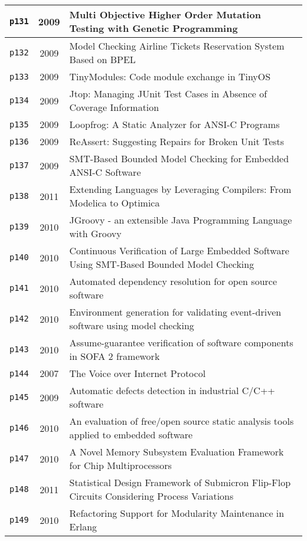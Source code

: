 \begin{longtable}{| c | c | p{16cm} |}
  \hline
  \texttt{p131} & 2009 & Multi Objective Higher Order Mutation Testing with Genetic Programming \\
  \hline
  \texttt{p132} & 2009 & Model Checking Airline Tickets Reservation System Based on BPEL \\
  \hline
  \texttt{p133} & 2009 & TinyModules: Code module exchange in TinyOS \\
  \hline
  \texttt{p134} & 2009 & Jtop: Managing JUnit Test Cases in Absence of Coverage Information \\
  \hline
  \texttt{p135} & 2009 & Loopfrog: A Static Analyzer for ANSI-C Programs \\
  \hline
  \texttt{p136} & 2009 & ReAssert: Suggesting Repairs for Broken Unit Tests \\
  \hline
  \texttt{p137} & 2009 & SMT-Based Bounded Model Checking for Embedded ANSI-C Software \\
  \hline
  \texttt{p138} & 2011 & Extending Languages by Leveraging Compilers: From Modelica to Optimica \\
  \hline
  \texttt{p139} & 2010 & JGroovy - an extensible Java Programming Language with Groovy \\
  \hline
  \texttt{p140} & 2010 & Continuous Verification of Large Embedded Software Using SMT-Based Bounded Model Checking \\
  \hline
  \texttt{p141} & 2010 & Automated dependency resolution for open source software \\
  \hline
  \texttt{p142} & 2010 & Environment generation for validating event-driven software using model checking \\
  \hline
  \texttt{p143} & 2010 & Assume-guarantee verification of software components in SOFA 2 framework \\
  \hline
  \texttt{p144} & 2007 & The Voice over Internet Protocol \\
  \hline
  \texttt{p145} & 2009 & Automatic defects detection in industrial C/C++ software \\
  \hline
  \texttt{p146} & 2010 & An evaluation of free/open source static analysis tools applied to embedded software \\
  \hline
  \texttt{p147} & 2010 & A Novel Memory Subsystem Evaluation Framework for Chip Multiprocessors \\
  \hline
  \texttt{p148} & 2011 & Statistical Design Framework of Submicron Flip-Flop Circuits Considering Process Variations \\
  \hline
  \texttt{p149} & 2010 & Refactoring Support for Modularity Maintenance in Erlang \\

\end{longtable}
